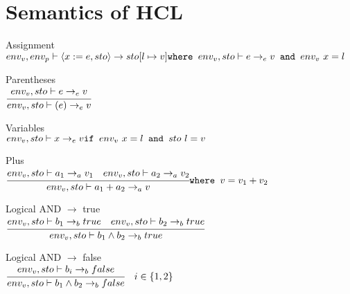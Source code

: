\section{Semantics of HCL}


Assignment\\
\begin{math}
	env_v, env_p \vdash \langle x := e, sto \rangle \rightarrow sto[l \mapsto v]\\
	\texttt{where } env_v, sto \vdash e \rightarrow_e v
	\texttt{ and } env_v \ x = l
\end{math}

Parentheses\\
\begin{math}
	\cfrac{env_v, sto \vdash e \rightarrow_e v}
	{env_v, sto \vdash (e) \rightarrow_e v}
\end{math}

Variables\\
\begin{math}
	env_v, sto \vdash x \rightarrow_e v\\
	\texttt{if } env_v \ x = l
	\texttt{ and } sto \ l = v
\end{math}

Plus\\
\begin{math}
	\cfrac{env_v, sto \vdash a_1 \rightarrow_a v_1 \quad env_v, sto \vdash a_2 \rightarrow_a v_2}
	{env_v, sto \vdash a_1 + a_2 \rightarrow_a v}\\
	\texttt{where } v = v_1 + v_2
\end{math}

Logical AND $\rightarrow$ true\\
\begin{math}
	\cfrac{env_v, sto \vdash b_1 \rightarrow_b true \quad env_v, sto \vdash b_2 \rightarrow_b true}
	{env_v, sto \vdash b_1 \wedge b_2 \rightarrow_b true}
\end{math}

Logical AND $\rightarrow$ false\\
\begin{math}
	\cfrac{env_v, sto \vdash b_i \rightarrow_b false}{env_v, sto \vdash b_1 \wedge b_2 \rightarrow_b false} \quad i \in \{1,2\}
\end{math}